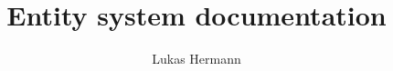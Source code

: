\documentclass[12pt, a4paper]{article}
\begin{document}
\title{Entity system documentation}
\author{Lukas Hermann}
\maketitle

\tableofcontents

\newpage


\end{document}
